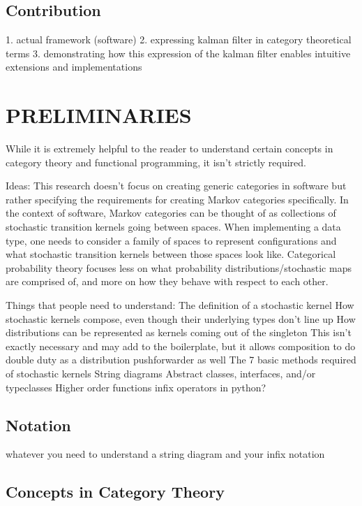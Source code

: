 \documentclass[letterpaper, 10 pt, conference]{ieeeconf}  %
\begin{document}
\subsection{Contribution}
1. actual framework (software)
2. expressing kalman filter in category theoretical terms
3. demonstrating how this expression of the kalman filter enables intuitive extensions and implementations

\section{PRELIMINARIES}

While it is extremely helpful to the reader to understand certain concepts in category theory and functional programming, it isn't strictly required.

Ideas:
This research doesn't focus on creating generic categories in software but rather specifying the requirements for creating Markov categories specifically.
In the context of software, Markov categories can be thought of as collections of stochastic transition kernels going between spaces.
When implementing a data type, one needs to consider a family of spaces to represent configurations and what stochastic transition kernels between those spaces look like.
Categorical probability theory focuses less on what probability distributions/stochastic maps are comprised of, and more on how they behave with respect to each other.

Things that people need to understand:
The definition of a stochastic kernel
How stochastic kernels compose, even though their underlying types don't line up
How distributions can be represented as kernels coming out of the singleton
	This isn't exactly necessary and may add to the boilerplate, but it allows composition to do double duty as a distribution pushforwarder as well
The 7 basic methods required of stochastic kernels
String diagrams
Abstract classes, interfaces, and/or typeclasses
Higher order functions
infix operators in python?

\subsection{Notation}

whatever you need to understand a string diagram and your infix notation

\subsection{Concepts in Category Theory}
\end{document}
